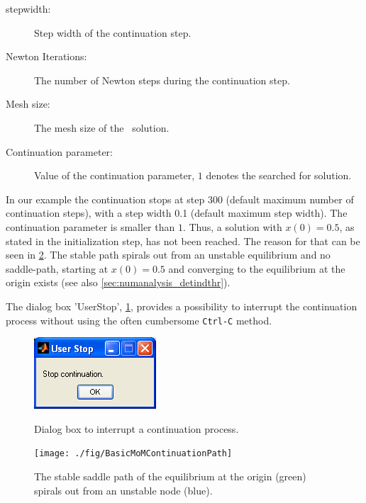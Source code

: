 \begin{description}
	\item[stepwidth:] Step width of the continuation step.
	\item[Newton Iterations:] The number of Newton steps during the continuation step.
	\item[Mesh size:] The mesh size of the \BVP\ solution.
	\item[Continuation parameter:] Value of the continuation parameter, $1$ denotes the searched for solution.
\end{description}
In our example the continuation stops at step 300 (default maximum number of continuation steps), with a step width 0.1 (default maximum step width). The continuation parameter is smaller than $1$. Thus, a solution with $x(0)=0.5$, as stated in the initialization step, has not been reached. The reason for that can be seen in \cref{fig:basicmomcontsol}. The stable path spirals out from an unstable equilibrium and no saddle-path, starting at $x(0)=0.5$ and converging to the equilibrium at the origin exists (see also \cref{sec:numanalysis_detindthr}).

The dialog box 'UserStop', \cref{fig:userstop}, provides a possibility to interrupt the continuation process without using the often cumbersome \lstinline+Ctrl-C+ method. 
\begin{figure}
\centering
\includegraphics[scale=\scalefactor]{./fig/UserStop}
\label{fig:userstop}
\caption{Dialog box to interrupt a continuation process.}
\end{figure}
\begin{figure}
\centering
\texttt{[image: ./fig/BasicMoMContinuationPath]}
\label{fig:basicmomcontsol}
\caption{The stable saddle path of the equilibrium at the origin (green) spirals out from an unstable node (blue).}
\end{figure}

